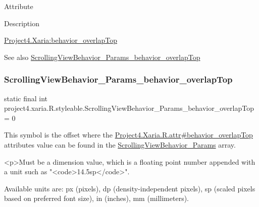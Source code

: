 Attribute

Description 

{\ttfamily \hyperlink{classproject4_1_1xaria_1_1R_1_1styleable_a8ca20a5a852719ef409f39f9b80e31d0}{Project4.\+Xaria\+:behavior\+\_\+overlap\+Top}}

\begin{DoxySeeAlso}{See also}
\hyperlink{classproject4_1_1xaria_1_1R_1_1styleable_a8ca20a5a852719ef409f39f9b80e31d0}{Scrolling\+View\+Behavior\+\_\+\+Params\+\_\+behavior\+\_\+overlap\+Top} 
\end{DoxySeeAlso}
\mbox{\label{classproject4_1_1xaria_1_1R_1_1styleable_a8ca20a5a852719ef409f39f9b80e31d0}} 
\subsubsection{\texorpdfstring{Scrolling\+View\+Behavior\+\_\+\+Params\+\_\+behavior\+\_\+overlap\+Top}{ScrollingViewBehavior\_Params\_behavior\_overlapTop}}
{\footnotesize\ttfamily static final int project4.\+xaria.\+R.\+styleable.\+Scrolling\+View\+Behavior\+\_\+\+Params\+\_\+behavior\+\_\+overlap\+Top = 0\hspace{0.3cm}{\ttfamily [static]}}

This symbol is the offset where the \hyperlink{}{Project4.\+Xaria.\+R.\+attr\#behavior\+\_\+overlap\+Top} attribute\textquotesingle{}s value can be found in the \hyperlink{classproject4_1_1xaria_1_1R_1_1styleable_ad06c19e0a242a55e8ea1a03b55b964d9}{Scrolling\+View\+Behavior\+\_\+\+Params} array.

\begin{DoxyVerb}      <p>Must be a dimension value, which is a floating point number appended with a unit such as "<code>14.5sp</code>".
\end{DoxyVerb}
 Available units are\+: px (pixels), dp (density-\/independent pixels), sp (scaled pixels based on preferred font size), in (inches), mm (millimeters). 

